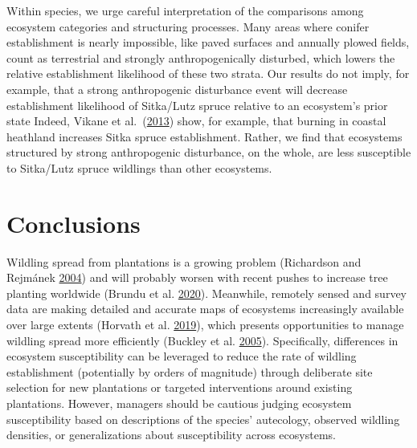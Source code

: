 \documentclass[
]{article}
\begin{document}
Within species, we urge careful interpretation of the comparisons among ecosystem categories and structuring processes.
Many areas where conifer establishment is nearly impossible, like paved surfaces and annually plowed fields, count as terrestrial and strongly anthropogenically disturbed, which lowers the relative establishment likelihood of these two strata.
Our results do not imply, for example, that a strong anthropogenic disturbance event will decrease establishment likelihood of Sitka/Lutz spruce relative to an ecosystem's prior state Indeed, Vikane et al.~(\protect\hyperlink{ref-vikaneInvasionCallunaHeath2013}{2013}) show, for example, that burning in coastal heathland increases Sitka spruce establishment.
Rather, we find that ecosystems structured by strong anthropogenic disturbance, on the whole, are less susceptible to Sitka/Lutz spruce wildlings than other ecosystems.

\hypertarget{conclusions}{%
\section{Conclusions}\label{conclusions}}

Wildling spread from plantations is a growing problem (Richardson and Rejmánek \protect\hyperlink{ref-richardsonConifersInvasiveAliens2004}{2004}) and will probably worsen with recent pushes to increase tree planting worldwide (Brundu et al. \protect\hyperlink{ref-brunduGlobalGuidelinesSustainable2020}{2020}).
Meanwhile, remotely sensed and survey data are making detailed and accurate maps of ecosystems increasingly available over large extents (Horvath et al. \protect\hyperlink{ref-horvathDistributionModellingVegetation2019}{2019}), which presents opportunities to manage wildling spread more efficiently (Buckley et al. \protect\hyperlink{ref-buckleySlowingPineInvasion2005}{2005}).
Specifically, differences in ecosystem susceptibility can be leveraged to
reduce the rate of wildling establishment (potentially by orders of magnitude) through deliberate site selection for new plantations or targeted interventions around existing plantations.
However, managers should be cautious judging ecosystem susceptibility based on descriptions of the species' autecology, observed wildling densities, or generalizations about susceptibility across ecosystems.
\end{document}
